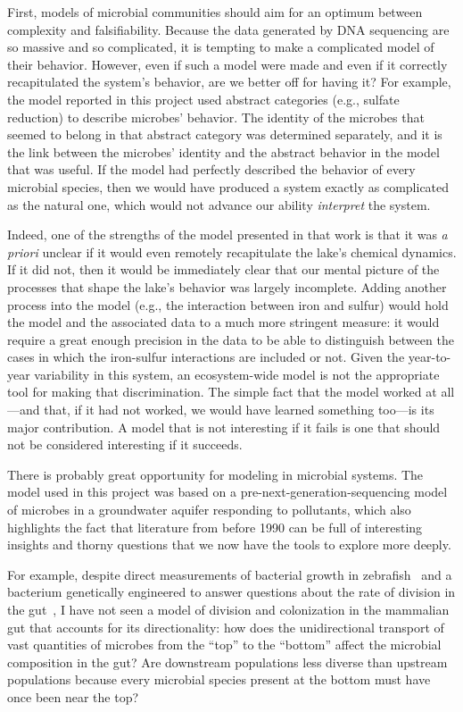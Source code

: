 First, models of microbial communities should aim for an optimum between complexity
and falsifiability. Because the data generated by DNA sequencing are so
massive and so complicated, it is tempting to make a complicated model
of their behavior. However, even if such a model were made and even if it
correctly recapitulated the system's behavior, are we better off for
having it? For example, the model reported in this project used abstract
categories (e.g., sulfate reduction) to describe microbes' behavior.
The identity of the microbes that seemed to belong in that abstract
category was determined separately, and it is the link between the
microbes' identity and the abstract behavior in the model that was useful.
If the model had perfectly described the behavior of every microbial
species, then we would have produced a system exactly as complicated
as the natural one, which would not advance our ability \emph{interpret}
the system.

Indeed, one of the strengths of the model presented in that work is that
it was \textit{a priori} unclear if it would even remotely recapitulate the lake's chemical
dynamics. If it did not, then it would be immediately clear that our mental
picture of the processes that shape the lake's behavior was largely
incomplete. Adding another process into the model (e.g., the interaction
between iron and sulfur) would hold the model and the associated data
to a much more stringent measure: it would require a great enough precision
in the data to be able to distinguish between the cases in which the
iron-sulfur interactions are included or not. Given the year-to-year
variability in this system, an ecosystem-wide model is not the appropriate
tool for making that discrimination. The simple fact that the model
worked at all---and that, if it had not worked, we would have learned
something too---is its major contribution. A model that is not interesting
if it fails is one that should not be considered interesting if it
succeeds.

There is probably great opportunity for modeling in microbial systems.
The model used in this project was based on a pre-next-generation-sequencing
model of microbes in a groundwater aquifer responding to pollutants,
which also highlights the fact that literature from before 1990 can
be full of interesting insights and thorny questions that we now have
the tools to explore more deeply.

For example, despite direct measurements of bacterial growth in
zebrafish~\cite{jemielita_spatial_2014} and a bacterium genetically
engineered to answer questions about the rate of division in the gut~\cite{myrhvold_distributed_2015},
I have not seen a model of division and colonization in the mammalian
gut that accounts for its directionality: how does the unidirectional transport
of vast quantities of microbes from the ``top'' to the ``bottom'' affect
the microbial composition in the gut? Are downstream populations
less diverse than upstream populations because every microbial species
present at the bottom must have once been near the top?

